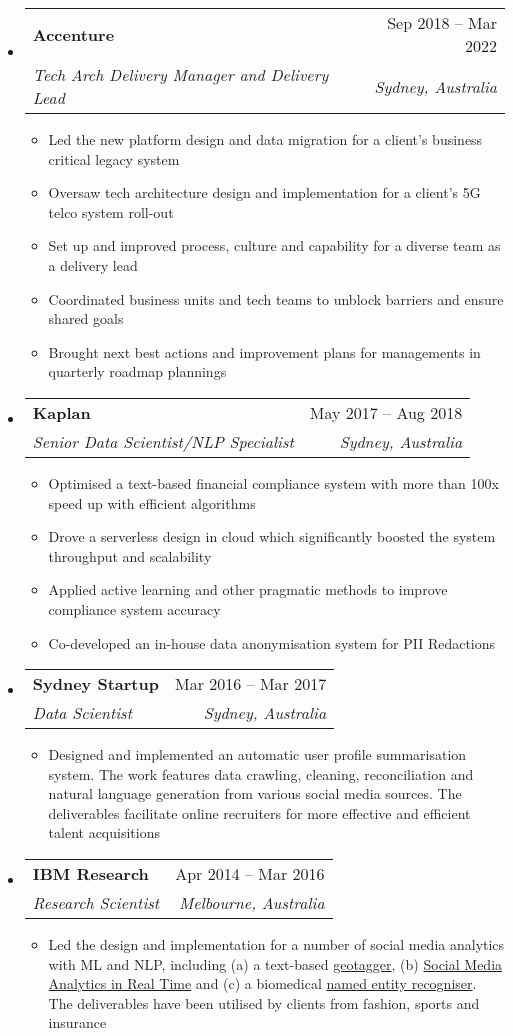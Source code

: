 \documentclass[letterpaper,12pt]{article}[leftmargin=*]
\makeatletter
\def \entryspacing {-0pt}
\newcommand{\resumeEntryStart}{\begin{itemize}[leftmargin=2.5mm]}
\newcommand{\resumeEntryEnd}{\end{itemize}\vspace{\entryspacing}}
\newcommand{\resumeItemListStart}{\begin{itemize}[leftmargin=4.5mm]}
\newcommand{\resumeItemListEnd}{\end{itemize}}
\newcommand{\resumeItem}[1]{
  \item\small{
    {#1 \vspace{-2pt}}
  }
}
\newcommand{\resumeEntryTSDL}[4]{
  \vspace{-1pt}\item[]
    \begin{tabularx}{0.97\textwidth}{X@{\hspace{60pt}}r}
      \textbf{\color{primary}#1} & {\firabook\color{accent}\small#2} \\
      \textit{\color{accent}\small#3} & \textit{\color{accent}\small#4} \\
    \end{tabularx}\vspace{-6pt}
}
\makeatother
\begin{document}
  \resumeEntryStart
    \resumeEntryTSDL
      {Accenture}{Sep 2018 -- Mar 2022}
      {Tech Arch Delivery Manager and Delivery Lead}{Sydney, Australia}
    \resumeItemListStart
      \resumeItem {Led the new platform design and data migration for a client's business critical legacy system}
      \resumeItem {Oversaw tech architecture design and implementation for a client's 5G telco system roll-out}
      \resumeItem {Set up and improved process, culture and capability for a diverse team as a delivery lead}
      \resumeItem {Coordinated business units and tech teams to unblock barriers and ensure shared goals}
      \resumeItem {Brought next best actions and improvement plans for managements in quarterly roadmap plannings}
    \resumeItemListEnd
  \resumeEntryEnd

  \resumeEntryStart
    \resumeEntryTSDL
      {Kaplan}{May 2017 -- Aug 2018}
      {Senior Data Scientist/NLP Specialist}{Sydney, Australia}
    \resumeItemListStart
      \resumeItem {Optimised a text-based financial compliance system with more than 100x speed up with efficient algorithms} 
      \resumeItem{Drove a serverless design in cloud which significantly boosted the system throughput and scalability}
      \resumeItem {Applied active learning and other pragmatic methods to improve compliance system accuracy}
      \resumeItem {Co-developed an in-house data anonymisation system for PII Redactions}
    \resumeItemListEnd
  \resumeEntryEnd

  \resumeEntryStart
    \resumeEntryTSDL
      {Sydney Startup}{Mar 2016 -- Mar 2017}
      {Data Scientist}{Sydney, Australia}
    \resumeItemListStart
        \resumeItem {Designed and implemented an automatic user profile summarisation system. The work features data crawling, cleaning, reconciliation and natural language generation from various social media sources. The deliverables facilitate online recruiters for more effective and efficient talent acquisitions}
    \resumeItemListEnd
  \resumeEntryEnd

  \resumeEntryStart
    \resumeEntryTSDL
      {IBM Research}{Apr 2014 -- Mar 2016}
      {Research Scientist}{Melbourne, Australia}
    \resumeItemListStart
      \resumeItem {Led the design and implementation for a number of social media analytics with ML and NLP, including (a) a text-based \href{http://researcher.watson.ibm.com/researcher/view_group.php?id=6349}{geotagger}, (b) \href{http://researcher.watson.ibm.com/researcher/view_group.php?id=6350}{Social Media Analytics in Real Time} and (c) a biomedical \href{http://researcher.watson.ibm.com/researcher/view_group_pubs.php?grp=5727}{named entity recogniser}. The deliverables have been utilised by clients from fashion, sports and insurance}
    \resumeItemListEnd
  \resumeEntryEnd
\end{document}
